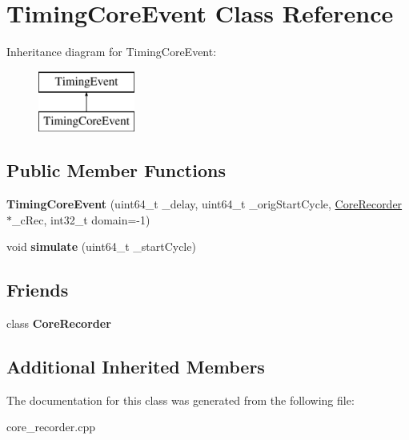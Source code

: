 \hypertarget{classTimingCoreEvent}{\section{Timing\-Core\-Event Class Reference}
\label{classTimingCoreEvent}
}
Inheritance diagram for Timing\-Core\-Event\-:\begin{figure}[H]
\begin{center}
\leavevmode
\includegraphics[height=2.000000cm]{classTimingCoreEvent}
\end{center}
\end{figure}
\subsection*{Public Member Functions}
\begin{DoxyCompactItemize}
\item 
\hypertarget{classTimingCoreEvent_a19cba8223db71910f8de5457594c3ccb}{{\bfseries Timing\-Core\-Event} (uint64\-\_\-t \-\_\-delay, uint64\-\_\-t \-\_\-orig\-Start\-Cycle, \hyperlink{classCoreRecorder}{Core\-Recorder} $\ast$\-\_\-c\-Rec, int32\-\_\-t domain=-\/1)}\label{classTimingCoreEvent_a19cba8223db71910f8de5457594c3ccb}

\item 
\hypertarget{classTimingCoreEvent_a0b4b3b3001aa807417ad96b858c73d27}{void {\bfseries simulate} (uint64\-\_\-t \-\_\-start\-Cycle)}\label{classTimingCoreEvent_a0b4b3b3001aa807417ad96b858c73d27}

\end{DoxyCompactItemize}
\subsection*{Friends}
\begin{DoxyCompactItemize}
\item 
\hypertarget{classTimingCoreEvent_ae75255bdc74d6066f82070da4666a90b}{class {\bfseries Core\-Recorder}}\label{classTimingCoreEvent_ae75255bdc74d6066f82070da4666a90b}

\end{DoxyCompactItemize}
\subsection*{Additional Inherited Members}


The documentation for this class was generated from the following file\-:\begin{DoxyCompactItemize}
\item 
core\-\_\-recorder.\-cpp\end{DoxyCompactItemize}
